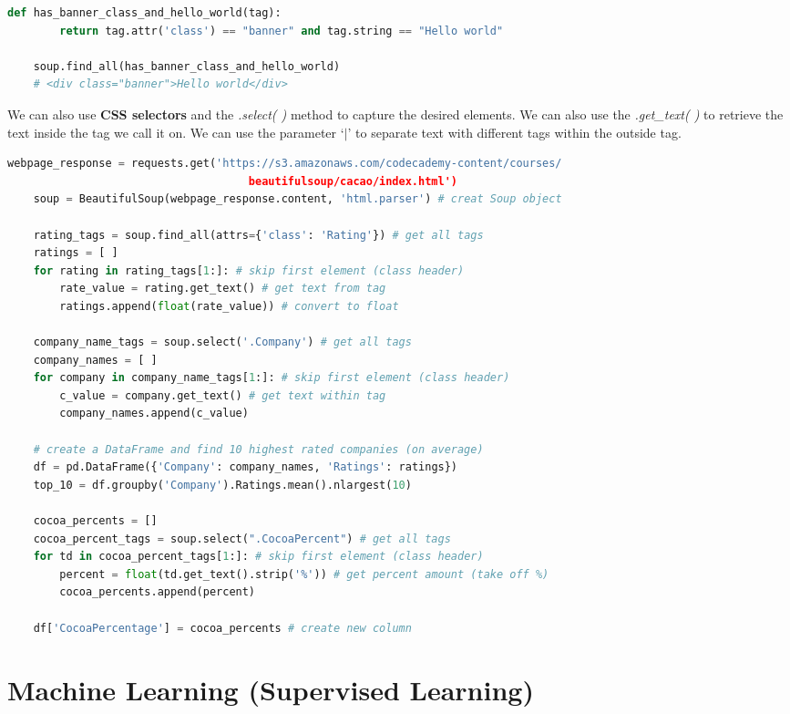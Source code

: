 \documentclass[11pt, a4paper]{article}
\begin{document}
\begin{spacing}{1.1}
\begin{lstlisting}[language=Python]
	def has_banner_class_and_hello_world(tag):
		return tag.attr('class') == "banner" and tag.string == "Hello world"
	
	soup.find_all(has_banner_class_and_hello_world) 
	# <div class="banner">Hello world</div>	\end{lstlisting}\vspace*{1mm}
	We can also use \textbf{CSS selectors} and the \textit{.select( )} method to capture the desired elements. We can also use the \textit{.get\_text( )} to retrieve the text inside the tag we call it on. We can use the parameter `$|$' to separate text with different tags within the outside tag. 
	\begin{lstlisting}[language=Python]
	webpage_response = requests.get('https://s3.amazonaws.com/codecademy-content/courses/
	                                 beautifulsoup/cacao/index.html')
	soup = BeautifulSoup(webpage_response.content, 'html.parser') # creat Soup object
	
	rating_tags = soup.find_all(attrs={'class': 'Rating'}) # get all tags
	ratings = [ ]
	for rating in rating_tags[1:]: # skip first element (class header)
		rate_value = rating.get_text() # get text from tag
		ratings.append(float(rate_value)) # convert to float
	
	company_name_tags = soup.select('.Company') # get all tags
	company_names = [ ]
	for company in company_name_tags[1:]: # skip first element (class header)
		c_value = company.get_text() # get text within tag
		company_names.append(c_value)
	
	# create a DataFrame and find 10 highest rated companies (on average)
	df = pd.DataFrame({'Company': company_names, 'Ratings': ratings})
	top_10 = df.groupby('Company').Ratings.mean().nlargest(10)
	
	cocoa_percents = []
	cocoa_percent_tags = soup.select(".CocoaPercent") # get all tags
	for td in cocoa_percent_tags[1:]: # skip first element (class header)
		percent = float(td.get_text().strip('%')) # get percent amount (take off %)
		cocoa_percents.append(percent)
	
	df['CocoaPercentage'] = cocoa_percents # create new column \end{lstlisting} \newpage

	\section{Machine Learning (Supervised Learning)}

\end{spacing}
\end{document}
